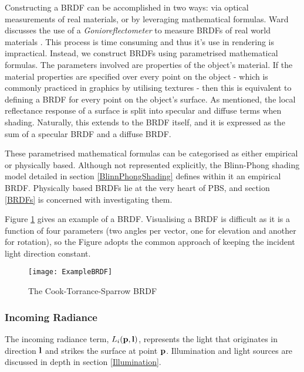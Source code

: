 Constructing a BRDF can be accomplished in two ways: via optical measurements of real materials, or by leveraging mathematical formulas. Ward discusses the use of a \textit{Gonioreflectometer} to measure BRDFs of real world materials \cite{MeasuringAnisotropicReflections}. This process is time consuming and thus it's use in rendering is impractical. Instead, we construct BRDFs using parametrised mathematical formulas. The parameters involved are properties of the object's material. If the material properties are specified over every point on the object - which is commonly practiced in graphics by utilising textures - then this is equivalent to defining a BRDF for every point on the object's surface. As mentioned, the local reflectance response of a surface is split into specular and diffuse terms when shading. Naturally, this extends to the BRDF itself, and it is expressed as the sum of a specular BRDF and a diffuse BRDF.

These parametrised mathematical formulas can be categorised as either empirical or physically based. Although not represented explicitly, the Blinn-Phong shading model detailed in section \ref{BlinnPhongShading} defines within it an empirical BRDF. Physically based BRDFs lie at the very heart of PBS, and section \ref{BRDFs} is concerned with investigating them.

Figure \ref{fig:ExampleBRDF} gives an example of a BRDF. Visualising a BRDF is difficult as it is a function of four parameters (two angles per vector, one for elevation and another for rotation), so the Figure adopts the common approach of keeping the incident light direction constant.

\begin{figure}[h]
	\centering
	\texttt{[image: ExampleBRDF]}
	\caption{The Cook-Torrance-Sparrow BRDF~\cite{VisualisingBRDFs}}
	\label{fig:ExampleBRDF}
\end{figure}

\subsubsection{Incoming Radiance}

The incoming radiance term, \begin{math}L_i(\mathbf{p}, \mathbf{l})\end{math}, represents the light that originates in direction \begin{math}\mathbf{l}\end{math} and strikes the surface at point \begin{math}\mathbf{p}\end{math}. Illumination and light sources are discussed in depth in section \ref{Illumination}.

